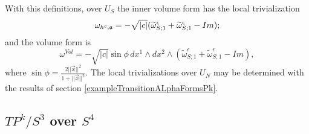 With this definitions, over $U_S$ the inner volume form has the local trivialization
\begin{equation}
    \omega_{h^c, \alg a} = -\sqrt{|c|} (\tilde \omega^\epsilon_{S; 1} + \tilde \omega^\epsilon_{S; 1} - Im);
\end{equation}
and the volume form is
\begin{equation}
    \omega^{Vol} = - \sqrt{|c|} \sin \phi \, dx^1 \wedge dx^2 \wedge (\tilde \omega^\epsilon_{S; 1} + \tilde \omega^\epsilon_{S; 1} - Im),
\end{equation}
where $\sin \phi = \frac{2 ||\vec x||^2}{1 + ||\vec x||^2}$.
The local trivializations over $U_N$ may be determined with the results of section \ref{exampleTransitionALphaFormsPk}.

\subsection{$TP^k/S^3$ over $S^4$}
\label{chIntegrationSubsectionS2}

